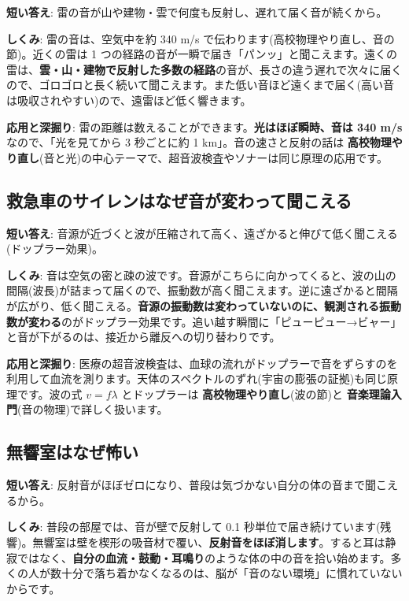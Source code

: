 \documentclass{article}
\begin{document}
\textbf{短い答え}: 雷の音が山や建物・雲で何度も反射し、遅れて届く音が続くから。

\textbf{しくみ}: 雷の音は、空気中を約 340 m/s で伝わります(高校物理やり直し、音の節)。近くの雷は 1 つの経路の音が一瞬で届き「パンッ」と聞こえます。遠くの雷は、\textbf{雲・山・建物で反射した多数の経路}の音が、長さの違う遅れで次々に届くので、ゴロゴロと長く続いて聞こえます。また低い音ほど遠くまで届く(高い音は吸収されやすい)ので、遠雷ほど低く響きます。

\textbf{応用と深掘り}: 雷の距離は数えることができます。\textbf{光はほぼ瞬時、音は 340 m/s} なので、「光を見てから 3 秒ごとに約 1 km」。音の速さと反射の話は \textbf{高校物理やり直し}(音と光)の中心テーマで、超音波検査やソナーは同じ原理の応用です。

\subsection{救急車のサイレンはなぜ音が変わって聞こえる}

\textbf{短い答え}: 音源が近づくと波が圧縮されて高く、遠ざかると伸びて低く聞こえる(ドップラー効果)。

\textbf{しくみ}: 音は空気の密と疎の波です。音源がこちらに向かってくると、波の山の間隔(波長)が詰まって届くので、振動数が高く聞こえます。逆に遠ざかると間隔が広がり、低く聞こえる。\textbf{音源の振動数は変わっていないのに、観測される振動数が変わる}のがドップラー効果です。追い越す瞬間に「ピューピュー→ビャー」と音が下がるのは、接近から離反への切り替わりです。

\textbf{応用と深掘り}: 医療の超音波検査は、血球の流れがドップラーで音をずらすのを利用して血流を測ります。天体のスペクトルのずれ(宇宙の膨張の証拠)も同じ原理です。波の式 \( v = f\lambda \) とドップラーは \textbf{高校物理やり直し}(波の節)と \textbf{音楽理論入門}(音の物理)で詳しく扱います。

\subsection{無響室はなぜ怖い}

\textbf{短い答え}: 反射音がほぼゼロになり、普段は気づかない自分の体の音まで聞こえるから。

\textbf{しくみ}: 普段の部屋では、音が壁で反射して 0.1 秒単位で届き続けています(残響)。無響室は壁を楔形の吸音材で覆い、\textbf{反射音をほぼ消します}。すると耳は静寂ではなく、\textbf{自分の血流・鼓動・耳鳴り}のような体の中の音を拾い始めます。多くの人が数十分で落ち着かなくなるのは、脳が「音のない環境」に慣れていないからです。
\end{document}
